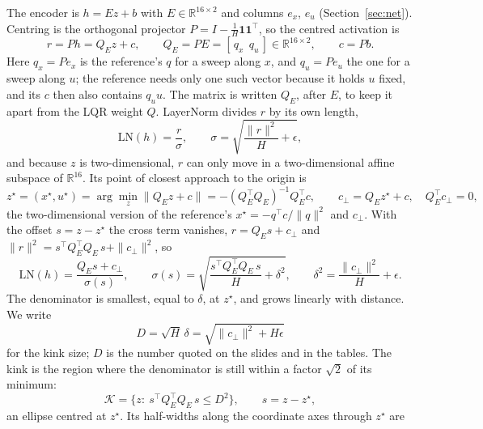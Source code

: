 \documentclass[11pt]{article}
\begin{document}
The encoder is $h=Ez+b$ with $E\in\mathbb R^{16\times2}$ and columns $e_x$, $e_u$ (Section~\ref{sec:net}). Centring is the orthogonal projector $P=I-\frac1H\mathbf 1\mathbf 1^\top$, so the centred activation is
\begin{equation}
r = Ph = Q_E z + c,\qquad Q_E = PE = [\,q_x\ \ q_u\,]\in\mathbb R^{16\times2},\qquad c = Pb .
\end{equation}
Here $q_x=Pe_x$ is the reference's $q$ for a sweep along $x$, and $q_u=Pe_u$ the one for a sweep along $u$; the reference needs only one such vector because it holds $u$ fixed, and its $c$ then also contains $q_u u$. The matrix is written $Q_E$, after $E$, to keep it apart from the LQR weight $Q$. LayerNorm divides $r$ by its own length,
\begin{equation}
\mathrm{LN}(h) = \frac{r}{\sigma},\qquad \sigma = \sqrt{\frac{\|r\|^2}{H}+\epsilon},
\end{equation}
and because $z$ is two-dimensional, $r$ can only move in a two-dimensional affine subspace of $\mathbb R^{16}$. Its point of closest approach to the origin is
\begin{equation}
z^\star = (x^\star,u^\star) = \arg\min_z\|Q_E z+c\| = -(Q_E^\top Q_E)^{-1}Q_E^\top c,\qquad c_\perp = Q_E z^\star+c,\quad Q_E^\top c_\perp = 0 ,
\end{equation}
the two-dimensional version of the reference's $x^\star=-q^\top c/\|q\|^2$ and $c_\perp$. With the offset $s=z-z^\star$ the cross term vanishes, $r = Q_E s + c_\perp$ and $\|r\|^2 = s^\top Q_E^\top Q_E\,s + \|c_\perp\|^2$, so
\begin{equation}
\mathrm{LN}(h) = \frac{Q_E s + c_\perp}{\sigma(s)},\qquad \sigma(s) = \sqrt{\frac{s^\top Q_E^\top Q_E\,s}{H} + \delta^2},\qquad \delta^2 = \frac{\|c_\perp\|^2}{H} + \epsilon .
\label{eq:ln}
\end{equation}
The denominator is smallest, equal to $\delta$, at $z^\star$, and grows linearly with distance. We write
\begin{equation}
D = \sqrt H\,\delta = \sqrt{\|c_\perp\|^2 + H\epsilon}
\end{equation}
for the kink size; $D$ is the number quoted on the slides and in the tables. The kink is the region where the denominator is still within a factor $\sqrt2$ of its minimum:
\begin{equation}
\mathcal K = \{z:\ s^\top Q_E^\top Q_E\,s \le D^2\},\qquad s = z - z^\star ,
\end{equation}
an ellipse centred at $z^\star$. Its half-widths along the coordinate axes through $z^\star$ are
\end{document}
